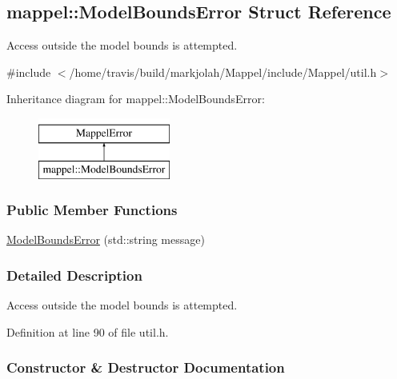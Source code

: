 \hypertarget{structmappel_1_1ModelBoundsError}{}\subsection{mappel\+:\+:Model\+Bounds\+Error Struct Reference}
\label{structmappel_1_1ModelBoundsError}


Access outside the model bounds is attempted.  




{\ttfamily \#include $<$/home/travis/build/markjolah/\+Mappel/include/\+Mappel/util.\+h$>$}

Inheritance diagram for mappel\+:\+:Model\+Bounds\+Error\+:\begin{figure}[H]
\begin{center}
\leavevmode
\includegraphics[height=2.000000cm]{structmappel_1_1ModelBoundsError}
\end{center}
\end{figure}
\subsubsection*{Public Member Functions}
\begin{DoxyCompactItemize}
\item 
\hyperlink{structmappel_1_1ModelBoundsError_aa5da32648cddf0c1bfc9b59c32531e09}{Model\+Bounds\+Error} (std\+::string message)
\end{DoxyCompactItemize}


\subsubsection{Detailed Description}
Access outside the model bounds is attempted. 

Definition at line 90 of file util.\+h.



\subsubsection{Constructor \& Destructor Documentation}
